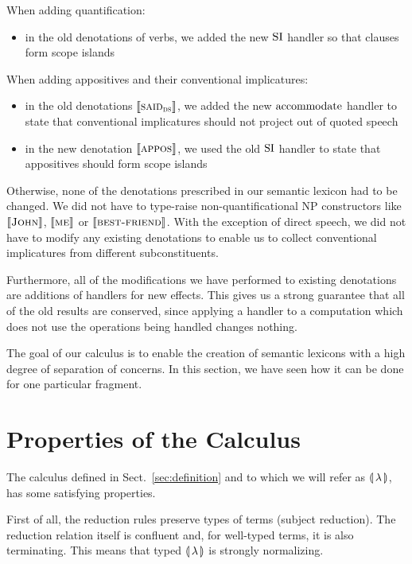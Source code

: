 \documentclass{llncs}
\begin{document}
When adding quantification:
\begin{itemize}
\item in the old denotations of verbs, we added the new $\operatorname{SI}$ handler so
  that clauses form scope islands
\end{itemize}

When adding appositives and their conventional implicatures:
\begin{itemize}
\item in the old denotations $\llbracket \textsc{said}_{\textsc{ds}} \rrbracket$, we added the new
  $\operatorname{accommodate}$ handler to state that conventional implicatures should not
  project out of quoted speech
\item in the new denotation $\llbracket \textsc{appos} \rrbracket$, we used the old $\operatorname{SI}$
  handler to state that appositives should form scope islands
\end{itemize}

Otherwise, none of the denotations prescribed in our semantic lexicon had
to be changed. We did not have to type-raise non-quantificational NP
constructors like $\llbracket \textsc{John} \rrbracket$, $\llbracket \textsc{me} \rrbracket$ or
$\llbracket \textsc{best-friend} \rrbracket$. With the exception of direct speech, we did not
have to modify any existing denotations to enable us to collect
conventional implicatures from different subconstituents.

Furthermore, all of the modifications we have performed to existing
denotations are additions of handlers for new effects. This gives us a
strong guarantee that all of the old results are conserved, since applying
a handler to a computation which does not use the operations being handled
changes nothing.

The goal of our calculus is to enable the creation of semantic lexicons
with a high degree of separation of concerns. In this section, we have seen
how it can be done for one particular fragment.


\section{Properties of the Calculus}
\label{sec:properties}

The calculus defined in Sect.~\ref{sec:definition} and to which we will
refer as $\llparenthesis \, \lambda \, \rrparenthesis$, has some satisfying properties.

First of all, the reduction rules preserve types of terms (subject
reduction). The reduction relation itself is confluent and, for well-typed
terms, it is also terminating. This means that typed $\llparenthesis \, \lambda \, \rrparenthesis$ is
strongly normalizing.
\end{document}

